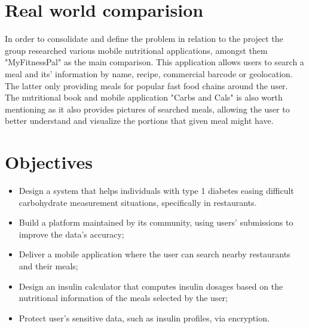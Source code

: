 \newpage
\section{Real world comparision}

In order to consolidate and define the problem in relation to the project the group
researched various mobile nutritional applications, amongst them "MyFitnessPal" as the main comparison.
This application allows users to search a meal and its' information by name, recipe, commercial barcode or geolocation. The latter
only providing meals for popular fast food chains around the user.\\

The nutritional book and mobile application "Carbs and Cals" is also worth mentioning as it also provides pictures 
of searched meals, allowing the user to better understand and visualize the portions that given meal might have.

\section{Objectives}

\begin{itemize}
    \item Design a system that helps individuals with type 1 diabetes easing difficult carbohydrate measurement situations, specifically in restaurants.
    \item Build a platform maintained by its community, using users' submissions to improve the data's accuracy;
    \item Deliver a mobile application where the user can search nearby restaurants and their meals;
    \item Design an insulin calculator that computes insulin dosages based on the nutritional information of the meals selected by the user;
    \item Protect user's sensitive data, such as insulin profiles, via encryption.
\end{itemize}